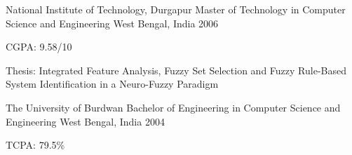 

\begin{cventries}

  \cventry
    {National Institute of Technology, Durgapur} %
    {Master of Technology} {in Computer Science and Engineering} %
    {West Bengal, India} %
    {2006} %
    {
      \begin{cvitems} %
        \item {CGPA: 9.58/10} %
        \item {Thesis: Integrated Feature Analysis, Fuzzy Set Selection and Fuzzy Rule-Based System Identification in a Neuro-Fuzzy Paradigm} %
      \end{cvitems}
    }

  \cventry
    {The University of Burdwan} %
    {Bachelor of Engineering} {in Computer Science and Engineering} %
    {West Bengal, India} %
    {2004} %
    {
      \begin{cvitems} %
        \item {TCPA: 79.5\%} %
      \end{cvitems}
    }
  \begin{comment}
  \cventry
    {Higher Secondary, West Bengal Council of Higher Secondary Education} %
    {Burnpur Boys' High School} %
    {West Bengal, India} %
    {2000} %
    {
      \begin{cvitems} %
        \item {Science Major, 79.4\%} %
      \end{cvitems}
    }

  \cventry
    {Secondary, West Bengal Board of Secondary Education} %
    {Asansol Ramakrishna Mission High School} %
    {West Bengal, India} %
    {1998} %
    {
      \begin{cvitems} %
        \item {82\%} %
      \end{cvitems}
    }
  \end{comment}

\end{cventries}
